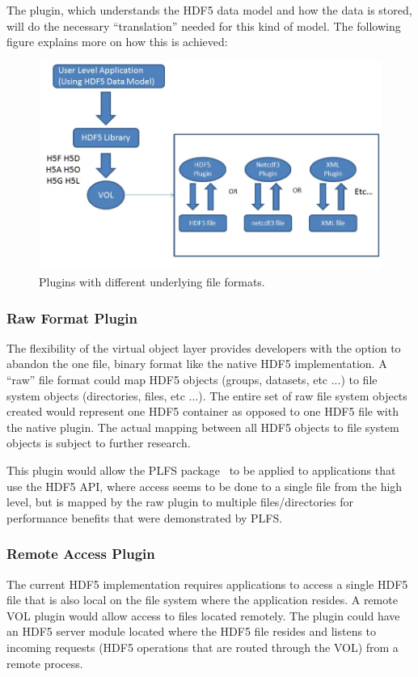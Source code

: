 \documentclass[letterpaper,hyper]{THG_RFC}
\begin{document}
The plugin, which understands the HDF5 data model and how the data is stored, will do the necessary ``translation'' needed for this kind of model. The following figure explains more on how this is achieved:

\begin{figure}[ht!]
\centering
\includegraphics[width=170mm]{pics/plugin-formats.jpg}
\caption{Plugins with different underlying file formats.}
\label{fig:formats}
\end{figure}

\subsubsection{Raw Format Plugin}
The flexibility of the virtual object layer provides developers with the option to abandon the one file, binary format like the native HDF5 implementation. A ``raw'' file format could map HDF5 objects (groups, datasets, etc ...) to file system objects (directories, files, etc ...). The entire set of raw file system objects created would represent one HDF5 container as opposed to one HDF5 file with the native plugin. The actual mapping between all HDF5 objects to file system objects is subject to further research.

This plugin would allow the PLFS package~\cite{plfs} to be applied to applications that use the HDF5 API, where access seems to be done to a single file from the high level, but is mapped by the raw plugin to multiple files/directories for performance benefits that were demonstrated by PLFS.

\subsubsection{Remote Access Plugin}
The current HDF5 implementation requires applications to access a single HDF5 file that is also local on the file system where the application resides. A remote VOL plugin would allow access to files located remotely. The plugin could have an HDF5 server module located where the HDF5 file resides and listens to incoming requests (HDF5 operations that are routed through the VOL) from a remote process. 
\end{document}
